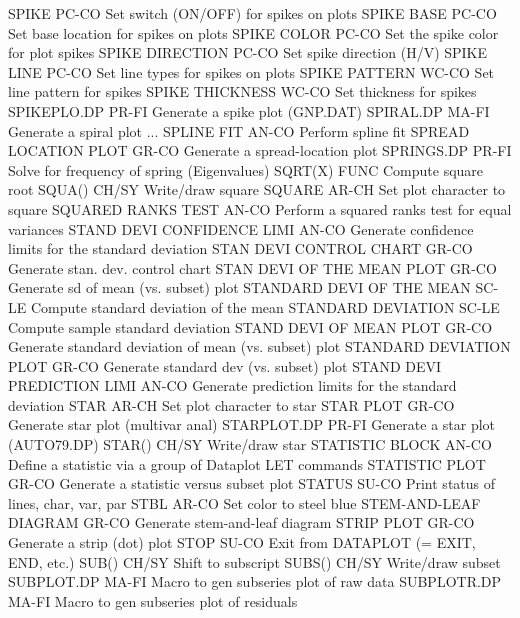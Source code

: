 SPIKE                       PC-CO Set switch (ON/OFF) for spikes on plots
SPIKE BASE                  PC-CO Set base location for spikes on plots
SPIKE COLOR                 PC-CO Set the spike color for plot spikes
SPIKE DIRECTION             PC-CO Set spike direction (H/V)
SPIKE LINE                  PC-CO Set line types for spikes on plots
SPIKE PATTERN               WC-CO Set line pattern for spikes
SPIKE THICKNESS             WC-CO Set thickness for spikes
SPIKEPLO.DP                 PR-FI Generate a spike plot (GNP.DAT)
SPIRAL.DP                   MA-FI Generate a spiral plot
... SPLINE FIT              AN-CO Perform spline fit
SPREAD LOCATION PLOT        GR-CO Generate a spread-location plot
SPRINGS.DP                  PR-FI Solve for frequency of spring (Eigenvalues)
SQRT(X)                     FUNC  Compute square root
SQUA()                      CH/SY Write/draw square
SQUARE                      AR-CH Set plot character to square
SQUARED RANKS TEST          AN-CO Perform a squared ranks test for equal variances
STAND DEVI CONFIDENCE LIMI  AN-CO Generate confidence limits for the standard deviation
STAN DEVI CONTROL CHART     GR-CO Generate stan. dev. control chart
STAN DEVI OF THE MEAN PLOT  GR-CO Generate sd of mean (vs. subset) plot
STANDARD DEVI OF THE MEAN   SC-LE Compute standard deviation of the mean
STANDARD DEVIATION          SC-LE Compute sample standard deviation
STAND DEVI OF MEAN PLOT     GR-CO Generate standard deviation of mean (vs. subset) plot
STANDARD DEVIATION PLOT     GR-CO Generate standard dev (vs. subset) plot
STAND DEVI PREDICTION LIMI  AN-CO Generate prediction limits for the standard deviation
STAR                        AR-CH Set plot character to star
STAR PLOT                   GR-CO Generate star plot (multivar anal)
STARPLOT.DP                 PR-FI Generate a star plot (AUTO79.DP)
STAR()                      CH/SY Write/draw star
STATISTIC BLOCK             AN-CO Define a statistic via a group of Dataplot LET commands
STATISTIC PLOT              GR-CO Generate a statistic versus subset plot
STATUS                      SU-CO Print status of lines, char, var, par
STBL                        AR-CO Set color to steel blue
STEM-AND-LEAF DIAGRAM       GR-CO Generate stem-and-leaf diagram
STRIP PLOT                  GR-CO Generate a strip (dot) plot
STOP                        SU-CO Exit from DATAPLOT (= EXIT, END, etc.)
SUB()                       CH/SY Shift to subscript
SUBS()                      CH/SY Write/draw subset
SUBPLOT.DP                  MA-FI Macro to gen subseries plot of raw data
SUBPLOTR.DP                 MA-FI Macro to gen subseries plot of residuals
